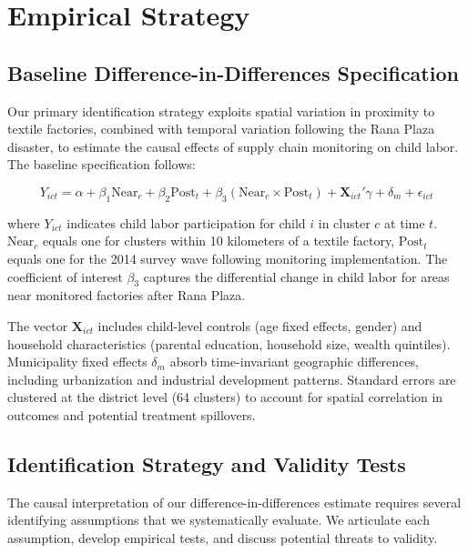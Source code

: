 \documentclass[12pt]{article}
\begin{document}
\section{Empirical Strategy}

\subsection{Baseline Difference-in-Differences Specification}

Our primary identification strategy exploits spatial variation in proximity to textile factories, combined with temporal variation following the Rana Plaza disaster, to estimate the causal effects of supply chain monitoring on child labor. The baseline specification follows:

\begin{equation}
Y_{ict} = \alpha + \beta_1 \text{Near}_c + \beta_2 \text{Post}_t + \beta_3 (\text{Near}_c \times \text{Post}_t) + \mathbf{X}_{ict}'\gamma + \delta_m + \epsilon_{ict}
\label{eq:main}
\end{equation}

where $Y_{ict}$ indicates child labor participation for child $i$ in cluster $c$ at time $t$. $\text{Near}_c$ equals one for clusters within 10 kilometers of a textile factory, $\text{Post}_t$ equals one for the 2014 survey wave following monitoring implementation. The coefficient of interest $\beta_3$ captures the differential change in child labor for areas near monitored factories after Rana Plaza.

The vector $\mathbf{X}_{ict}$ includes child-level controls (age fixed effects, gender) and household characteristics (parental education, household size, wealth quintiles). Municipality fixed effects $\delta_m$ absorb time-invariant geographic differences, including urbanization and industrial development patterns. Standard errors are clustered at the district level (64 clusters) to account for spatial correlation in outcomes and potential treatment spillovers.

\subsection{Identification Strategy and Validity Tests}

The causal interpretation of our difference-in-differences estimate requires several identifying assumptions that we systematically evaluate. We articulate each assumption, develop empirical tests, and discuss potential threats to validity.
\end{document}
